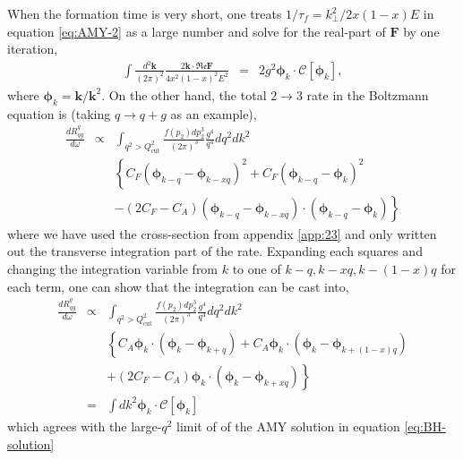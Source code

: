\documentclass[aps, prc, reprint, amsmath, groupedaddress, nofootinbib]{revtex4-1}
\begin{document}
When the formation time is very short, one treats $1/\tau_f = k_\perp^2/2x(1-x)E$ in equation \ref{eq:AMY-2} as a large number and solve for the real-part of $\mathbf{F}$ by one iteration,
\begin{eqnarray}
\int\frac{d^2\mathbf{k}}{(2\pi)^2} \frac{2\mathbf{k}\cdot \mathfrak{Re} \mathbf{F}}{4x^2(1-x)^2E^2} &=& 2g^2 \mathbf{\phi}_k\cdot \mathcal{C}[\mathbf{\phi}_k] \label{eq:BH-solution},
\end{eqnarray}
where $\mathbf{\phi}_k = \mathbf{k}/\mathbf{k}^2$.
On the other hand, the total $2\rightarrow 3$ rate in the Boltzmann equation is (taking $q\rightarrow q+g$ as an example),
\begin{eqnarray}
\frac{dR^{q}_{qg}}{d\omega} &\propto&  \int_{q^2 > Q_{\textrm{cut}}^2}   \frac{f(p_2)dp_2^3}{(2\pi)^3}  \frac{g^4}{q^4} dq^2 d k^2\\\nonumber
&& \left\{
C_F\left( \mathbf{\phi}_{k-q}-\mathbf{\phi}_{k-xq} \right)^2
+ C_F\left( \mathbf{\phi}_{k-q}-\mathbf{\phi}_{k} \right)^2\right.\\\nonumber
&&\left.
- (2C_F-C_A)\left( \mathbf{\phi}_{k-q}-\mathbf{\phi}_{k-xq} \right)\cdot \left( \mathbf{\phi}_{k-q}-\mathbf{\phi}_{k} \right)
\right\}
\end{eqnarray}
where we have used the cross-section from appendix \ref{app:23} and only written out the transverse integration part of the rate.
Expanding each squares and changing the integration variable from $k$ to one of $k-q, k-xq, k-(1-x)q$ for each term, one can show that the integration can be cast into,
\begin{eqnarray}
\frac{dR^{q}_{qg}}{d\omega} &\propto& \int_{q^2 > Q_{\textrm{cut}}^2}  \frac{f(p_2)dp_2^3}{(2\pi)^3} \frac{g^4}{q^4} d q^2 dk^2\\\nonumber
&& \left\{
C_A\mathbf{\phi}_{k}\cdot \left( \mathbf{\phi}_{k}-\mathbf{\phi}_{k+q} \right)
+C_A\mathbf{\phi}_{k} \cdot \left( \mathbf{\phi}_k - \mathbf{\phi}_{k+(1-x)q}\right) \right.\\\nonumber
&&\left.+(2C_F-C_A)\mathbf{\phi}_{k} \cdot \left(\mathbf{\phi}_k-\mathbf{\phi}_{k+xq} \right)
\right\} \\
&=&  \int dk^2 \mathbf{\phi}_k \cdot \mathcal{C}[\mathbf{\phi}_k]
\end{eqnarray}
which agrees with the large-$q^2$ limit of of the AMY solution in equation \ref{eq:BH-solution}
\end{document}

